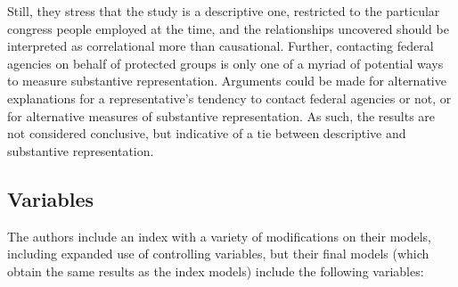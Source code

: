 \documentclass[12pt,letterpaper]{article}
\begin{document}
	Still, they stress that the study is a descriptive one, restricted to the particular congress people employed at the time, and the relationships uncovered should be interpreted as correlational more than causational. Further, contacting federal agencies on behalf of protected groups is only one of a myriad of potential ways to measure substantive representation. Arguments could be made for alternative explanations for a representative's tendency to contact federal agencies or not, or for alternative measures of substantive representation. As such, the results are not considered conclusive, but indicative of a tie between descriptive and substantive representation.\\
	
	\newpage
	
	\vspace{.25cm}
	\subsection*{Variables}
	
	The authors include an index with a variety of modifications on their models, including expanded use of controlling variables, but their final models (which obtain the same results as the index models) include the following variables:\\
	
\end{document}
